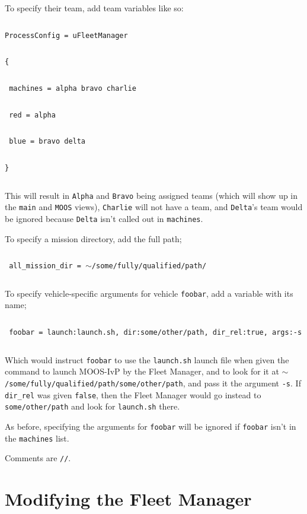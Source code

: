 \documentclass[11pt]{article}
\newcommand{\cmdline}[1]{\vspace{.2em} $\:$\\ \begin{minipage}{\dimexpr\textwidth-2cm}
\texttt{#1}
\end{minipage} $\:$\\ \vspace{-.2em} }
\begin{document}
To specify their team, add team variables like so:

\cmdline{ProcessConfig = uFleetManager}
\cmdline{\{}
\cmdline{	machines = alpha bravo charlie}
\cmdline{	red = alpha}
\cmdline{	blue = bravo delta}
\cmdline{\}}

This will result in \texttt{Alpha} and \texttt{Bravo} being assigned teams (which will show up in the \texttt{main} and \texttt{MOOS} views), \texttt{Charlie} will not have a team, and \texttt{Delta}'s team would be ignored because \texttt{Delta} isn't called out in \texttt{machines}.

To specify a mission directory, add the full path;

\cmdline{	all\_mission\_dir = $\sim$/some/fully/qualified/path/}

To specify vehicle-specific arguments for vehicle \texttt{foobar}, add a variable with its name;

\cmdline{	foobar = launch:launch.sh, dir:some/other/path, dir\_rel:true, args:-s}

Which would instruct \texttt{foobar} to use the \texttt{launch.sh} launch file when given the command to launch MOOS-IvP by the Fleet Manager, and to look for it at \texttt{$\sim$/some/fully/qualified/path/some/other/path}, and pass it the argument \texttt{-s}. If \texttt{dir\_rel} was given \texttt{false}, then the Fleet Manager would go instead to \texttt{some/other/path} and look for \texttt{launch.sh} there.

As before, specifying the arguments for \texttt{foobar} will be ignored if \texttt{foobar} isn't in the \texttt{machines} list.

Comments are \texttt{//}.

\section{Modifying the Fleet Manager}
\end{document}
